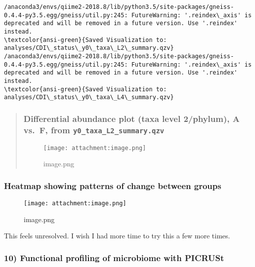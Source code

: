 \documentclass[11pt]{article}
\makeatletter
\def\maxwidth{\ifdim\Gin@nat@width>\linewidth\linewidth
    \else\Gin@nat@width\fi}
\let\Oldincludegraphics\includegraphics
\renewcommand{\includegraphics}[1]{\Oldincludegraphics[width=.8\maxwidth]{#1}}
\makeatother
\begin{document}
    \begin{Verbatim}[commandchars=\\\{\}]
/anaconda3/envs/qiime2-2018.8/lib/python3.5/site-packages/gneiss-0.4.4-py3.5.egg/gneiss/util.py:245: FutureWarning: '.reindex\_axis' is deprecated and will be removed in a future version. Use '.reindex' instead.
\textcolor{ansi-green}{Saved Visualization to: analyses/CDI\_status\_y0\_taxa\_L2\_summary.qzv}
/anaconda3/envs/qiime2-2018.8/lib/python3.5/site-packages/gneiss-0.4.4-py3.5.egg/gneiss/util.py:245: FutureWarning: '.reindex\_axis' is deprecated and will be removed in a future version. Use '.reindex' instead.
\textcolor{ansi-green}{Saved Visualization to: analyses/CDI\_status\_y0\_taxa\_L4\_summary.qzv}

    \end{Verbatim}

    \begin{quote}
\hypertarget{differential-abundance-plot-taxa-level-2phylum-a-vs.f-from-y0_taxa_l2_summary.qzv}{%
\subsubsection{\texorpdfstring{Differential abundance plot (taxa level
2/phylum), A vs.~F, from
\texttt{y0\_taxa\_L2\_summary.qzv}}{Differential abundance plot (taxa level 2/phylum), A vs.~F, from y0\_taxa\_L2\_summary.qzv}}\label{differential-abundance-plot-taxa-level-2phylum-a-vs.f-from-y0_taxa_l2_summary.qzv}}

\begin{figure}
\centering
\texttt{[image: attachment:image.png]}
\caption{image.png}
\end{figure}
\end{quote}

    \hypertarget{heatmap-showing-patterns-of-change-between-groups}{%
\subsubsection{Heatmap showing patterns of change between
groups}\label{heatmap-showing-patterns-of-change-between-groups}}

\begin{figure}
\centering
\texttt{[image: attachment:image.png]}
\caption{image.png}
\end{figure}

This feels unresolved. I wish I had more time to try this a few more
times.

    \hypertarget{functional-profiling-of-microbiome-with-picrust}{%
\subsubsection{10) Functional profiling of microbiome with
PICRUSt}\label{functional-profiling-of-microbiome-with-picrust}}
\end{document}

